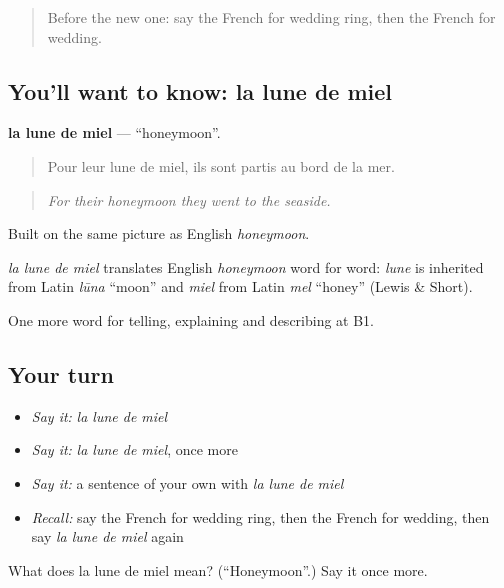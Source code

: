 \begin{quote}
Before the new one: say the French for wedding ring, then the French for wedding.
\end{quote}

\subsection*{You'll want to know: la lune de miel}
\textbf{la lune de miel} — \textquotedblleft{}honeymoon\textquotedblright{}.

\begin{quote}
Pour leur lune de miel, ils sont partis au bord de la mer.
\end{quote}

\begin{quote}
\emph{For their honeymoon they went to the seaside.}
\end{quote}

Built on the same picture as English \emph{honeymoon}.

\begin{cousinweb}
\emph{la lune de miel} translates English \emph{honeymoon} word for word: \emph{lune} is inherited from Latin \emph{lūna} \textquotedblleft{}moon\textquotedblright{} and \emph{miel} from Latin \emph{mel} \textquotedblleft{}honey\textquotedblright{} (Lewis \& Short).
\end{cousinweb}

\begin{grammarlens}[title={What you've built}]
One more word for telling, explaining and describing at B1.
\end{grammarlens}

\subsection*{Your turn}
\begin{itemize}
\raggedright
  \item \emph{Say it:} \emph{la lune de miel}
  \item \emph{Say it:} \emph{la lune de miel}, once more
  \item \emph{Say it:} a sentence of your own with \emph{la lune de miel}
  \item \emph{Recall:} say the French for wedding ring, then the French for wedding, then say \emph{la lune de miel} again
\end{itemize}

\begin{tcolorbox}[breakable,colback=teal!4,colframe=teal!35!black,title={Before you move on}]
What does la lune de miel mean? (\textquotedblleft{}Honeymoon\textquotedblright{}.) Say it once more.
\end{tcolorbox}
